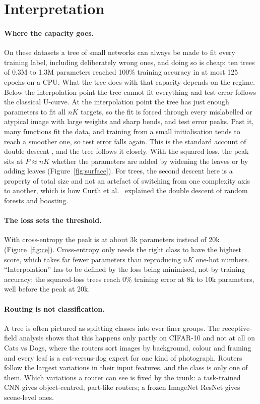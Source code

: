 \section{Interpretation}
\label{sec:interp}
\paragraph{Where the capacity goes.} On these datasets a tree of small networks can always be made to fit every training label, including deliberately wrong ones, and doing so is cheap: ten trees of 0.3M to 1.3M parameters reached 100\% training accuracy in at most 125 epochs on a CPU. What the tree does with that capacity depends on the regime. Below the interpolation point the tree cannot fit everything and test error follows the classical U-curve. At the interpolation point the tree has just enough parameters to fit all $nK$ targets, so the fit is forced through every mislabelled or atypical image with large weights and sharp bends, and test error peaks. Past it, many functions fit the data, and training from a small initialisation tends to reach a smoother one, so test error falls again. This is the standard account of double descent \cite{belkin2019, nakkiran2019}, and the tree follows it closely. With the squared loss, the peak sits at $P\approx nK$ whether the parameters are added by widening the leaves or by adding leaves (Figure~\ref{fig:surface}). For trees, the second descent here is a property of total size and not an artefact of switching from one complexity axis to another, which is how Curth et al.\ \cite{curth2023} explained the double descent of random forests and boosting.

\paragraph{The loss sets the threshold.} With cross-entropy the peak is at about 3k parameters instead of 20k (Figure~\ref{fig:ce}). Cross-entropy only needs the right class to have the highest score, which takes far fewer parameters than reproducing $nK$ one-hot numbers. ``Interpolation'' has to be defined by the loss being minimised, not by training accuracy: the squared-loss trees reach 0\% training error at 8k to 10k parameters, well before the peak at 20k.

\paragraph{Routing is not classification.} A tree is often pictured as splitting classes into ever finer groups. The receptive-field analysis shows that this happens only partly on CIFAR-10 and not at all on Cats vs Dogs, where the routers sort images by background, colour and framing and every leaf is a cat-versus-dog expert for one kind of photograph. Routers follow the largest variations in their input features, and the class is only one of them. Which variations a router can see is fixed by the trunk: a task-trained CNN gives object-centred, part-like routers; a frozen ImageNet ResNet gives scene-level ones.

